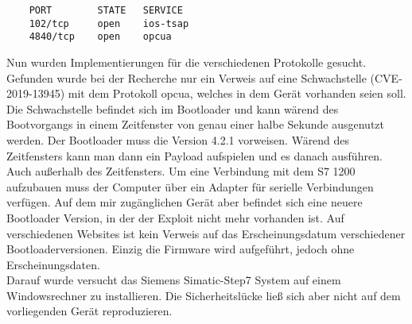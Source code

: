\begin{verbatim}
	PORT 		STATE 	SERVICE
	102/tcp 	open	ios-tsap
	4840/tcp 	open	opcua
\end{verbatim}






\noindent Nun wurden Implementierungen für die verschiedenen Protokolle gesucht.
Gefunden wurde bei der Recherche nur ein Verweis auf eine Schwachstelle (CVE-2019-13945) mit dem Protokoll opcua, welches in dem Gerät vorhanden seien soll.
Die Schwachstelle befindet sich im Bootloader und kann wärend des Bootvorgangs in einem Zeitfenster von genau einer halbe Sekunde 
ausgenutzt werden. Der Bootloader muss die Version 4.2.1 vorweisen. Wärend des Zeitfensters kann man dann ein Payload aufspielen und es danach ausführen. 
Auch außerhalb des Zeitfensters. 
Um eine Verbindung mit dem S7 1200 aufzubauen muss der Computer über ein Adapter für serielle Verbindungen verfügen.
Auf dem mir zugänglichen Gerät aber befindet sich eine neuere Bootloader Version, in der der Exploit nicht mehr vorhanden ist.
Auf verschiedenen Websites ist kein Verweis auf das Erscheinungsdatum verschiedener Bootloaderversionen. Einzig die Firmware wird aufgeführt, 
jedoch ohne Erscheinungsdaten.\\
Darauf wurde versucht das Siemens Simatic-Step7 System auf einem Windowsrechner zu installieren. 
Die Sicherheitslücke ließ sich aber nicht auf dem vorliegenden Gerät reproduzieren.
\cite{wire}
\cite{nmap}

